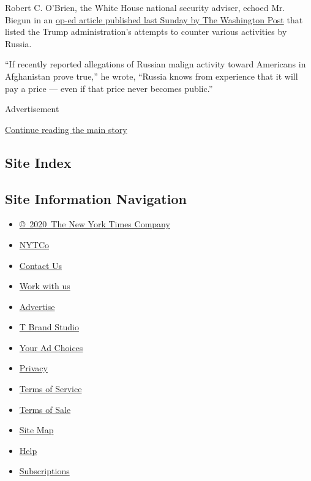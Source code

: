 Robert C. O'Brien, the White House national security adviser, echoed Mr.
Biegun in an
\href{https://www.washingtonpost.com/opinions/2020/08/02/president-trump-is-committed-defending-us-russia-knows-it/}{op-ed
article published last Sunday by The Washington Post} that listed the
Trump administration's attempts to counter various activities by Russia.

``If recently reported allegations of Russian malign activity toward
Americans in Afghanistan prove true,'' he wrote, ``Russia knows from
experience that it will pay a price --- even if that price never becomes
public.''

Advertisement

\protect\hyperlink{after-bottom}{Continue reading the main story}

\hypertarget{site-index}{%
\subsection{Site Index}\label{site-index}}

\hypertarget{site-information-navigation}{%
\subsection{Site Information
Navigation}\label{site-information-navigation}}

\begin{itemize}
\tightlist
\item
  \href{https://help.nytimes3xbfgragh.onion/hc/en-us/articles/115014792127-Copyright-notice}{©~2020~The
  New York Times Company}
\end{itemize}

\begin{itemize}
\tightlist
\item
  \href{https://www.nytco.com/}{NYTCo}
\item
  \href{https://help.nytimes3xbfgragh.onion/hc/en-us/articles/115015385887-Contact-Us}{Contact
  Us}
\item
  \href{https://www.nytco.com/careers/}{Work with us}
\item
  \href{https://nytmediakit.com/}{Advertise}
\item
  \href{http://www.tbrandstudio.com/}{T Brand Studio}
\item
  \href{https://www.nytimes3xbfgragh.onion/privacy/cookie-policy\#how-do-i-manage-trackers}{Your
  Ad Choices}
\item
  \href{https://www.nytimes3xbfgragh.onion/privacy}{Privacy}
\item
  \href{https://help.nytimes3xbfgragh.onion/hc/en-us/articles/115014893428-Terms-of-service}{Terms
  of Service}
\item
  \href{https://help.nytimes3xbfgragh.onion/hc/en-us/articles/115014893968-Terms-of-sale}{Terms
  of Sale}
\item
  \href{https://spiderbites.nytimes3xbfgragh.onion}{Site Map}
\item
  \href{https://help.nytimes3xbfgragh.onion/hc/en-us}{Help}
\item
  \href{https://www.nytimes3xbfgragh.onion/subscription?campaignId=37WXW}{Subscriptions}
\end{itemize}
